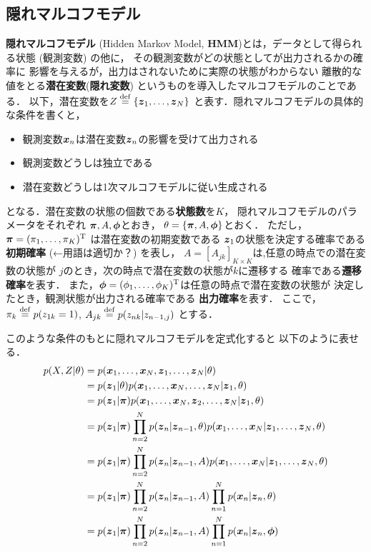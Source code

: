 \subsection{隠れマルコフモデル}
\label{sec:prepare:hidden-markov-model}
\textbf{隠れマルコフモデル} (Hidden Markov Model, \textbf{HMM})とは，データとして得られる状態
 (観測変数) の他に，
その観測変数がどの状態としてが出力されるかの確率に
影響を与えるが，出力はされないために実際の状態がわからない
離散的な値をとる\textbf{潜在変数}(\textbf{隠れ変数})
というものを導入したマルコフモデルのことである．
以下，潜在変数を$Z \overset{\mathrm{def}}{=} \{\mbox{\boldmath $z$}_1, \dots, \mbox{\boldmath $z$}_N\}$
と表す．隠れマルコフモデルの具体的な条件を書くと，
\begin{itemize}
\item 観測変数$\mbox{\boldmath $x$}_n$は潜在変数$\mbox{\boldmath $z$}_n$の影響を受けて出力される
\item 観測変数どうしは独立である
\item 潜在変数どうしは1次マルコフモデルに従い生成される
\end{itemize}
となる．潜在変数の状態の個数である\textbf{状態数}を$K$，
隠れマルコフモデルのパラメータをそれぞれ
$\mbox{\boldmath $\pi$}, A, \mbox{\boldmath $\phi$}$とおき，
$\theta = \{\mbox{\boldmath $\pi$}, A, \mbox{\boldmath $\phi$}\}$とおく．
ただし，$\mbox{\boldmath $\pi$} = (\pi_1,\dots,\pi_K)^{\mathrm T}$
は潜在変数の初期変数である
$\mbox{\boldmath $z$}_1$の状態を決定する確率である
\textbf{初期確率} (←用語は適切か？) を表し，
$A = [A_{jk}]_{K\times K}$は,任意の時点での潜在変数の状態が
$j$のとき，次の時点で潜在変数の状態が$k$に遷移する
確率である\textbf{遷移確率}を表す．
また，$\mbox{\boldmath $\phi$}=(\phi_1,\dots,\phi_K)^{\mathrm T}$は任意の時点で潜在変数の状態が
決定したとき，観測状態が出力される確率である
\textbf{出力確率}を表す．
ここで，$\pi_k \overset{\mathrm{def}}{=} p(z_{1k}=1)$, $A_{jk} \overset{\mathrm{def}}{=} p(z_{nk}|z_{n-1,j})$
とする．

このような条件のもとに隠れマルコフモデルを定式化すると
以下のように表せる．
\begin{align}
  p(X,Z|\theta) &= p(\mbox{\boldmath $x$}_1, \dots, \mbox{\boldmath $x$}_N, \mbox{\boldmath $z$}_1, \dots, \mbox{\boldmath $z$}_N|\theta) \\
  &= p(\mbox{\boldmath $z$}_1|\theta)p(\mbox{\boldmath $x$}_1, \dots, \mbox{\boldmath $x$}_N, \dots, \mbox{\boldmath $z$}_N|\mbox{\boldmath $z$}_1,\theta) \\
  &= p(\mbox{\boldmath $z$}_1|\mbox{\boldmath $\pi$})p(\mbox{\boldmath $x$}_1, \dots, \mbox{\boldmath $x$}_N,\mbox{\boldmath $z$}_2, \dots, \mbox{\boldmath $z$}_N|\mbox{\boldmath $z$}_1,\theta) \\
  &= p(\mbox{\boldmath $z$}_1|\mbox{\boldmath $\pi$})\prod_{n=2}^Np(\mbox{\boldmath $z$}_n|\mbox{\boldmath $z$}_{n-1},\theta)p(\mbox{\boldmath $x$}_1, \dots, \mbox{\boldmath $x$}_N|\mbox{\boldmath $z$}_1,\dots,\mbox{\boldmath $z$}_N,\theta) \\
  &= p(\mbox{\boldmath $z$}_1|\mbox{\boldmath $\pi$})\prod_{n=2}^Np(\mbox{\boldmath $z$}_n|\mbox{\boldmath $z$}_{n-1},A)p(\mbox{\boldmath $x$}_1, \dots, \mbox{\boldmath $x$}_N|\mbox{\boldmath $z$}_1,\dots,\mbox{\boldmath $z$}_N,\theta) \\
  &= p(\mbox{\boldmath $z$}_1|\mbox{\boldmath $\pi$})\prod_{n=2}^Np(\mbox{\boldmath $z$}_n|\mbox{\boldmath $z$}_{n-1},A)\prod_{n=1}^Np(\mbox{\boldmath $x$}_n|\mbox{\boldmath $z$}_n,\theta) \\
  &= p(\mbox{\boldmath $z$}_1| \mbox{\boldmath $\pi$})\prod_{n=2}^Np(\mbox{\boldmath $z$}_n|\mbox{\boldmath $z$}_{n-1},A)\prod_{n=1}^Np(\mbox{\boldmath $x$}_n|\mbox{\boldmath $z$}_n,\mbox{\boldmath $\phi$}) \label{eq:hmm-distribution}\\
\end{align}

